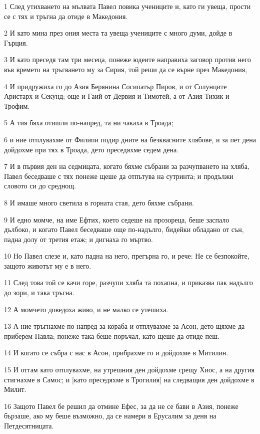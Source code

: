 \par 1 След утихването на мълвата Павел повика учениците и, като ги увеща, прости се с тях и тръгна да отиде в Македония.
\par 2 И като мина през ония места та увеща учениците с много думи, дойде в Гърция.
\par 3 И като преседя там три месеца, понеже юдеите направиха заговор против него във времето на тръгването му за Сирия, той реши да се върне през Македония,
\par 4 И придружиха го до Азия Берянина Сосипатър Пиров, и от Солунците Аристарх и Секунд; още и Гаий от Дервия и Тимотей, а от Азия Тихик и Трофим.
\par 5 А тия бяха отишли по-напред, та ни чакаха в Троада;
\par 6 и ние отплувахме от Филипи подир дните на безквасните хлябове, и за пет дена дойдохме при тях в Троада, дето преседяхме седем дена.
\par 7 И в първия ден на седмицата, когато бяхме събрани за разчупването на хляба, Павел беседваше с тях понеже щеше да отпътува на сутринта; и продължи словото си до среднощ.
\par 8 И имаше много светила в горната стая, дето бяхме събрани.
\par 9 И едно момче, на име Ефтих, което седеше на прозореца, беше заспало дълбоко, и когато Павел беседваше още по-надълго, бидейки обладано от сън, падна долу от третия етаж; и дигнаха го мъртво.
\par 10 Но Павел слезе и, като падна на него, прегърна го, и рече: Не се безпокойте, защото животът му е в него.
\par 11 След това той се качи горе, разчупи хляба та похапна, и приказва пак надълго до зори, и така тръгна.
\par 12 А момчето доведоха живо, и не малко се утешиха.
\par 13 А ние тръгнахме по-напред за кораба и отплувахме за Асон, дето щяхме да приберем Павла; понеже така беше поръчал, като щеше да отиде пеш.
\par 14 И когато се събра с нас в Асон, прибрахме го и дойдохме в Митилин.
\par 15 И оттам като отплувахме, на утрешния ден дойдохме срещу Хиос, а на другия стигнахме в Самос; и [като преседяхме в Трогилия] на следващия ден дойдохме в Милит.
\par 16 Защото Павел бе решил да отмине Ефес, за да не се бави в Азия, понеже бързаше, ако му беше възможно, да се намери в Ерусалим за деня на Петдесятницата.
